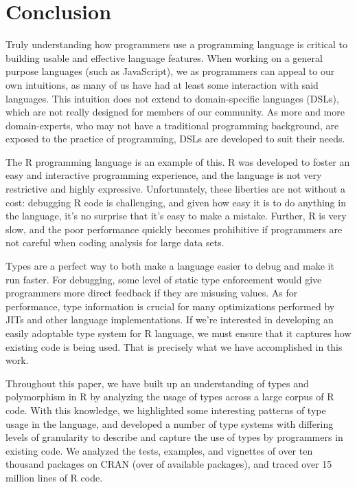 \documentclass[acmsmall,10pt,review,anonymous]{acmart}\settopmatter{printfolios=true,printccs=false,printacmref=false}
\begin{document}
%
%
%
%
%
\section{Conclusion}

Truly understanding how programmers use a programming language is critical to building usable and effective language features.
When working on a general purpose languages (such as JavaScript), we as programmers can appeal to our own intuitions, as many of us have had at least some interaction with said languages.
This intuition does not extend to domain-specific languages (DSLs), which are not really designed for members of our community.
As more and more domain-experts, who may not have a traditional programming background, are exposed to the practice of programming, DSLs are developed to suit their needs.

The R programming language is an example of this.
R was developed to foster an easy and interactive programming experience, and the language is not very restrictive and highly expressive.
Unfortunately, these liberties are not without a cost: debugging R code is challenging, and given how easy it is to do anything in the language, it's no surprise that it's easy to make a mistake.
Further, R is very slow, and the poor performance quickly becomes prohibitive if programmers are not careful when coding analysis for large data sets.

Types are a perfect way to both make a language easier to debug and make it run faster.
For debugging, some level of static type enforcement would give programmers more direct feedback if they are misusing values.
As for performance, type information is crucial for many optimizations performed by JITs and other language implementations.
If we're interested in developing an easily adoptable type system for R language, we must ensure that it captures how existing code is being used.
That is precisely what we have accomplished in this work.

Throughout this paper, we have built up an understanding of types and polymorphism in R by analyzing the usage of types across a large corpus of R code.
With this knowledge, we highlighted some interesting patterns of type usage in the language, and developed a number of type systems with differing levels of granularity to describe and capture the use of types by programmers in existing code.
We analyzed the tests, examples, and vignettes of over ten thousand packages on CRAN (over \PERCENTCRAN of available packages), and traced over 15 million lines of R code.
\end{document}
